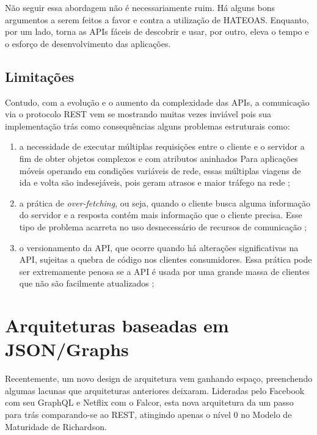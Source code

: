 Não seguir essa abordagem não é necessariamente ruim. Há alguns bons argumentos a serem feitos a favor e contra a utilização de HATEOAS. Enquanto, por um lado, torna as APIs fáceis de descobrir e usar, por outro, eleva o tempo e o esforço de desenvolvimento das aplicações.

\subsection{Limitações}

Contudo, com a evolução e o aumento da complexidade das APIs, a comunicação via o protocolo REST vem se mostrando muitas vezes inviável pois sua implementação trás como consequências alguns problemas estruturais como:

\begin{enumerate}[label=\alph*)]

\item a necessidade de executar múltiplas requisições entre o cliente e o servidor a fim de obter objetos complexos e com atributos aninhados  Para aplicações móveis operando em condições variáveis de rede, essas múltiplas viagens de ida e volta são indesejáveis, pois geram atrasos e maior tráfego na rede \cite{graphQl-overview};

\item a prática de \textit{over-fetching}, ou seja, quando o cliente busca alguma informação do servidor e a resposta contém mais informação que o cliente precisa. Esse tipo de problema acarreta no uso desnecessário de recursos de comunicação  \cite{efficient-data-communication};

\item o versionamento da API, que ocorre quando há alterações significativas na API, sujeitas a quebra de código nos clientes consumidores. Essa prática pode ser extremamente penosa se a API é usada por uma grande massa de clientes que não são facilmente atualizados \cite{api-versioning};

\end{enumerate}

\section{Arquiteturas baseadas em JSON/Graphs}\label{sec:graph}

Recentemente, um novo design de arquitetura vem ganhando espaço, preenchendo algumas lacunas que arquiteturas anteriores deixaram. Lideradas pelo Facebook com seu GraphQL e Netflix com o Falcor, esta nova arquitetura da um passo para trás comparando-se ao REST, atingindo apenas o nível 0 no Modelo de Maturidade de Richardson. 

